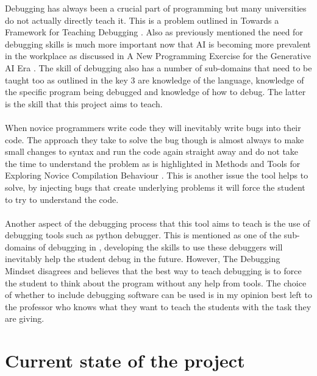 \documentclass[12pt]{extarticle}
\begin{document}
Debugging has always been a crucial part of programming but many universities do not actually directly teach it. This is a problem outlined in Towards a Framework for Teaching Debugging \cite{li2019}. Also as previously mentioned the need for debugging skills is much more important now that AI is becoming more prevalent in the workplace as discussed in A New Programming Exercise for the Generative AI Era \cite{denny2024}. The skill of debugging also has a number of sub-domains that need to be taught too as outlined in \cite{li2019} the key 3 are knowledge of the language, knowledge of the specific program being debugged and knowledge of how to debug. The latter is the skill that this project aims to teach.\\
\\
When novice programmers write code they will inevitably write bugs into their code. The approach they take to solve the bug though is almost always to make small changes to syntax and run the code again straight away and do not take the time to understand the problem as is highlighted in Methods and Tools for Exploring Novice Compilation Behaviour \cite{jadud2006}. This is another issue the tool helps to solve, by injecting bugs that create underlying problems it will force the student to try to understand the code.\\
\\
Another aspect of the debugging process that this tool aims to teach is the use of debugging tools such as python debugger. This is mentioned as one of the sub-domains of debugging in \cite{li2019}, developing the skills to use these debuggers will inevitably help the student debug in the future. However, The Debugging Mindset \cite{odell2017} disagrees and believes that the best way to teach debugging is to force the student to think about the program without any help from tools. The choice of whether to include debugging software can be used is in my opinion best left to the professor who knows what they want to teach the students with the task they are giving.\\

\section{Current state of the project}
\end{document}
